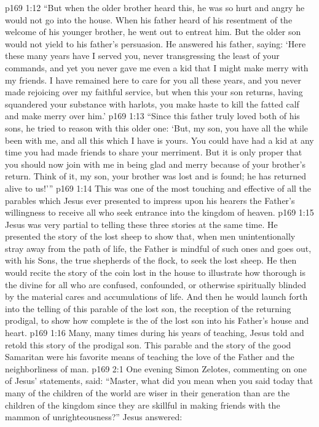 \vs p169 1:12 \textcolor{ubdarkred}{“But when the older brother heard this, he was so hurt and angry he would not go into the house. When his father heard of his resentment of the welcome of his younger brother, he went out to entreat him. But the older son would not yield to his father’s persuasion. He answered his father, saying: ‘Here these many years have I served you, never transgressing the least of your commands, and yet you never gave me even a kid that I might make merry with my friends. I have remained here to care for you all these years, and you never made rejoicing over my faithful service, but when this your son returns, having squandered your substance with harlots, you make haste to kill the fatted calf and make merry over him.’}
\vs p169 1:13 \textcolor{ubdarkred}{“Since this father truly loved both of his sons, he tried to reason with this older one: ‘But, my son, you have all the while been with me, and all this which I have is yours. You could have had a kid at any time you had made friends to share your merriment. But it is only proper that you should now join with me in being glad and merry because of your brother’s return. Think of it, my son, your brother was lost and is found; he has returned alive to us!’”}
\pc \vs p169 1:14 This was one of the most touching and effective of all the parables which Jesus ever presented to impress upon his hearers the Father’s willingness to receive all who seek entrance into the kingdom of heaven.
\vs p169 1:15 Jesus was very partial to telling these three stories at the same time. He presented the story of the lost sheep to show that, when men unintentionally stray away from the path of life, the Father is mindful of such  ones and goes out, with his Sons, the true shepherds of the flock, to seek the lost sheep. He then would recite the story of the coin lost in the house to illustrate how thorough is the divine  for all who are confused, confounded, or otherwise spiritually blinded by the material cares and accumulations of life. And then he would launch forth into the telling of this parable of the lost son, the reception of the returning prodigal, to show how complete is the  of the lost son into his Father’s house and heart.\plusone
\vs p169 1:16 Many, many times during his years of teaching, Jesus told and retold this story of the prodigal son. This parable and the story of the good Samaritan were his favorite means of teaching the love of the Father and the neighborliness of man.
\vs p169 2:1 One evening Simon Zelotes, commenting on one of Jesus’ statements, said: “Master, what did you mean when you said today that many of the children of the world are wiser in their generation than are the children of the kingdom since they are skillful in making friends with the mammon of unrighteousness?” Jesus answered:

